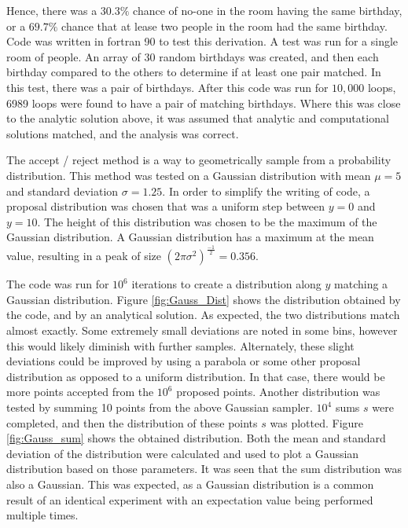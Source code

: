 \message{ !name(Assn1.tex)}\documentclass[twocolumn]{article}
\begin{document}
Hence, there was a $30.3\% $ chance of no-one in the room having the same birthday, or a $69.7\%$ chance that at lease two people in the room had the same birthday. Code was written in fortran 90 to test this derivation. A test was run for a single room of people. An array of 30 random birthdays was created, and then each birthday compared to the others to determine if at least one pair matched. In this test, there was a pair of birthdays. After this code was run for $10,000$ loops, 6989 loops were found to have a pair of matching birthdays. Where this was close to the analytic solution above, it was assumed that analytic and computational solutions matched, and the analysis was correct.

The accept / reject method is a way to geometrically sample from a probability distribution. This method was tested on a Gaussian distribution with mean $\mu=5$ and standard deviation $\sigma=1.25$. In order to simplify the writing of code, a proposal distribution was chosen that was a uniform step between $y=0$ and $y=10$. The height of this distribution was chosen to be the maximum of the Gaussian distribution. A Gaussian distribution has a maximum at the mean value, resulting in a peak of size $(2 \pi \sigma^2)^{\frac{-1}{2}} = 0.356$. 

The code was run for $10^6$ iterations to create a distribution along $y$ matching a Gaussian distribution. Figure \ref{fig:Gauss_Dist} shows the distribution obtained by the code, and by an analytical solution. As expected, the two distributions match almost exactly. Some extremely small deviations are noted in some bins, however this would likely diminish with further samples. Alternately, these slight deviations could be improved by using a parabola or some other proposal distribution as opposed to a uniform distribution. In that case, there would be more points accepted from the $10^6$ proposed points. Another distribution was tested by summing 10 points from the above Gaussian sampler. $10^4$ sums $s$ were completed, and then the distribution of these points $s$ was plotted. Figure \ref{fig:Gauss_sum} shows the obtained distribution. Both the mean and standard deviation of the distribution were calculated and used to plot a Gaussian distribution based on those parameters. It was seen that the sum distribution was also a Gaussian. This was expected, as a Gaussian distribution is a common result of an identical experiment with an expectation value being performed multiple times.
\end{document}
